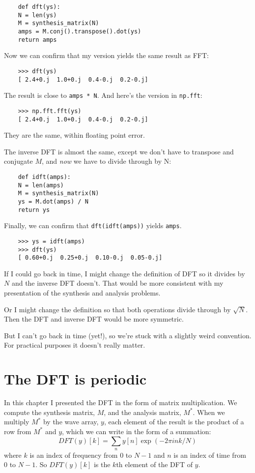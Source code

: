 \begin{verbatim}
	def dft(ys):
	N = len(ys)
	M = synthesis_matrix(N)
	amps = M.conj().transpose().dot(ys)
	return amps
\end{verbatim}

Now we can confirm that my version yields the same result as
FFT:

\begin{verbatim}
	>>> dft(ys)
	[ 2.4+0.j  1.0+0.j  0.4-0.j  0.2-0.j]
\end{verbatim}

The result is close to {\tt amps * N}.
And here's the version in {\tt np.fft}:

\begin{verbatim}
	>>> np.fft.fft(ys)
	[ 2.4+0.j  1.0+0.j  0.4-0.j  0.2-0.j]
\end{verbatim}

They are the same, within floating point error.

The inverse DFT is almost the same, except we don't have to transpose
and conjugate $M$, and {\em now} we have to divide through by N:

\begin{verbatim}
	def idft(amps):
	N = len(amps)
	M = synthesis_matrix(N)
	ys = M.dot(amps) / N
	return ys
\end{verbatim}

Finally, we can confirm that {\tt dft(idft(amps))} yields {\tt amps}.

\begin{verbatim}
	>>> ys = idft(amps)
	>>> dft(ys)
	[ 0.60+0.j  0.25+0.j  0.10-0.j  0.05-0.j]
\end{verbatim}

If I could go back in time, I might change the definition of
DFT so it divides by $N$ and the inverse DFT doesn't.  That would
be more consistent with my presentation of the synthesis and analysis
problems.

Or I might change the definition so that both operations divide
through by $\sqrt{N}$.  Then the DFT and inverse DFT would be
more symmetric.

But I can't go back in time (yet!), so we're stuck with a slightly
weird convention.  For practical purposes it doesn't really
matter.


\section{The DFT is periodic}

In this chapter I presented the DFT in the form of matrix multiplication.
We compute the synthesis matrix, $M$, and the analysis matrix, $M^*$.
When we multiply $M^{*}$ by the wave array, $y$, each element of the
result is the product of a row from $M^*$ and $y$, which we can
write in the form of a summation:
%
\[ DFT(y)[k] = \sum_n y[n] \exp(-2 \pi i n k / N) \]
%
where $k$ is an index of frequency from
$0$ to $N-1$ and $n$ is an index of time from $0$ to $N-1$.
So $DFT(y)[k]$ is the $k$th element of the DFT of $y$.

